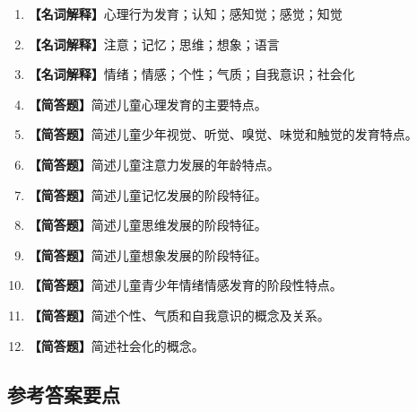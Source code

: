 \begin{enumerate}[leftmargin=*, itemsep=8pt]
    \item \textbf{【名词解释】}心理行为发育；认知；感知觉；感觉；知觉
    \item \textbf{【名词解释】}注意；记忆；思维；想象；语言
    \item \textbf{【名词解释】}情绪；情感；个性；气质；自我意识；社会化
    \item \textbf{【简答题】}简述儿童心理发育的主要特点。
    \item \textbf{【简答题】}简述儿童少年视觉、听觉、嗅觉、味觉和触觉的发育特点。
    \item \textbf{【简答题】}简述儿童注意力发展的年龄特点。
    \item \textbf{【简答题】}简述儿童记忆发展的阶段特征。
    \item \textbf{【简答题】}简述儿童思维发展的阶段特征。
    \item \textbf{【简答题】}简述儿童想象发展的阶段特征。
    \item \textbf{【简答题】}简述儿童青少年情绪情感发育的阶段性特点。
    \item \textbf{【简答题】}简述个性、气质和自我意识的概念及关系。
    \item \textbf{【简答题】}简述社会化的概念。
\end{enumerate}

\subsection*{参考答案要点}

